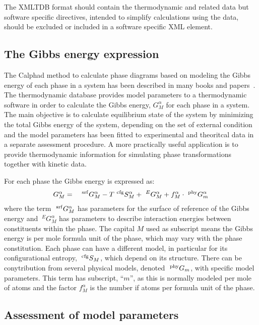 \documentclass[12pt]{article}
\begin{document}
The XMLTDB format should contain the thermodynamic and related data
but software specific directives, intended to simplify calculations
using the data, should be excluded or included in a software specific
XML element.

\subsection{The Gibbs energy expression}

The Calphad method to calculate phase diagrams based on modeling the
Gibbs energy of each phase in a system has been described in many
books and papers~\cite{70Kau,98Sau,08Hil,09Luk, 14Cam,
  14Kau,19Pel,21Sun}.  The thermodynamic database provides model
parameters to a thermodynamic software in order to calculate the Gibbs
energy, $G^{\alpha}_M$ for each phase in a system.  The main objective
is to calculate equilibrium state of the system by minimizing the
total Gibbs energy of the system, depending on the set of external
condition and the model parameters has been fitted to experimental and
theoritcal data in a separate assessment procedure.  A more
practically useful application is to provide thermodynamic information
for simulating phase transformations together with kinetic data.

For each phase the Gibbs energy is expressed as:
\begin{eqnarray}
  G^{\alpha}_M &=& ~^{\rm srf}G^{\alpha}_M - T~^{\rm cfg}S^{\alpha}_M + ~^EG^{\alpha}_M + f^{\alpha}_M \cdot ~^{\rm phy}G^{\alpha}_m  \label{eq:generic}
\end{eqnarray}
where the term $~^{\rm srf}G^{\alpha}_M$ has parameters for the
surface of reference of the Gibbs energy and $~^EG^{\alpha}_M$ has
parameters to describe interaction energies between constituents
within the phase.  The capital $M$ used as subscript means the Gibbs
energy is per mole formula unit of the phase, which may vary with the
phase constitution.  Each phase can have a different model, in
particular for its configurational entropy, $~^{\rm cfg}S_M$, which
depend on its structure.  There can be conytribution from several
physical models, denoted $~^{\rm phy}G_m$, with specific model
parameters. This term has subscript, ``$m$'', as this is normally
modeled per mole of atoms and the factor $f^{\alpha}_M$ is the number
if atoms per formula unit of the phase.

\subsection{Assessment of model parameters}
\end{document}
